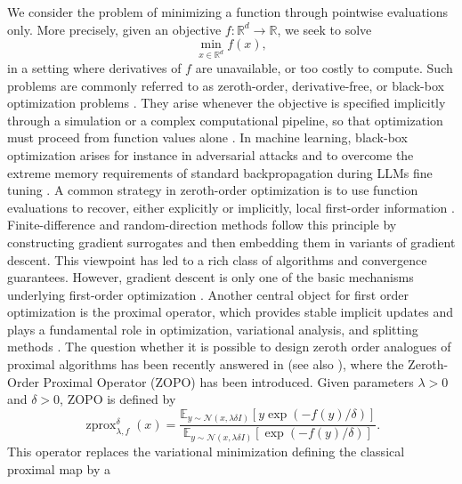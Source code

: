 \documentclass{article}
\newcommand{\zprox}{\ensuremath{\operatorname{zprox}}}
\begin{document}
We consider the problem of minimizing a function through pointwise evaluations only. More precisely, given an objective $f:\mathbb{R}^d\to\mathbb{R}$, we seek to solve
\begin{equation}
\label{eq:P}\tag{P}
    \min_{x\in\mathbb{R}^d} f(x),
\end{equation}
in a setting where derivatives of $f$ are unavailable, or too costly to compute. Such problems are commonly referred to as zeroth-order, derivative-free, or black-box optimization problems \cite{Spall,Conn2009,Larson2019}. They arise whenever the objective is specified implicitly through a simulation or a complex computational pipeline, so that optimization must proceed from function values alone \cite{Salimans2017EvolutionSA,Mania18,pmlr-v80-choromanski18a,flaxman2005online}.
In machine learning, black-box optimization arises for instance in adversarial attacks \cite{chen2017zoo} and  to overcome the extreme memory requirements of standard backpropagation during LLMs fine tuning \cite{zhang2024revisiting}.
A common strategy in zeroth-order optimization is to use function evaluations to recover, either explicitly or implicitly, local first-order information \cite{Spall,Conn2009}. Finite-difference and random-direction methods \cite{Conn2009,nest} follow this principle by constructing gradient surrogates and then embedding them in variants of gradient descent. This viewpoint has led to a rich class of algorithms and convergence guarantees. However, gradient descent is only one of the basic mechanisms underlying first-order optimization \cite{BeckBook}. Another central object for first order optimization is the proximal operator, which provides stable implicit updates and plays a fundamental role in optimization, variational analysis, and splitting methods \cite{combettes2005signal}. The question whether it is possible to design zeroth order analogues of proximal algorithms has been recently answered in \cite{osher2023hamilton} (see also \cite{crandall1984}), where the Zeroth-Order Proximal Operator (ZOPO) has been introduced. Given parameters \(\lambda>0\) and \(\delta>0\), ZOPO is
defined by
\begin{equation}\label{eq:def_zprox_intro}
   \zprox^\delta_{\lambda, f}(x)
    =
    \frac{
    \mathbb{E}_{y\sim\mathcal{N}(x,\lambda\delta I)}
    \left[y\exp(-f(y)/\delta)\right]
    }{
    \mathbb{E}_{y\sim\mathcal{N}(x,\lambda\delta I)}
    \left[\exp(-f(y)/\delta)\right]
    }.
\end{equation}
This operator replaces the variational minimization defining the classical proximal map by a
\end{document}
